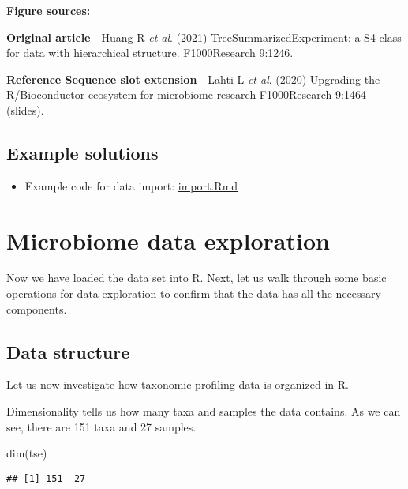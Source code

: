 \documentclass[
]{book}
\newenvironment{Shaded}{\begin{snugshade}}{\end{snugshade}}
\newcommand{\FunctionTok}[1]{\textcolor[rgb]{0.00,0.00,0.00}{#1}}
\newcommand{\NormalTok}[1]{#1}
\providecommand{\tightlist}{%
  \setlength{\itemsep}{0pt}\setlength{\parskip}{0pt}}
\begin{document}
\textbf{Figure sources:}

\textbf{Original article}
- Huang R \emph{et al}. (2021) \href{https://doi.org/10.12688/\%20f1000research.26669.2}{TreeSummarizedExperiment: a S4 class
for data with hierarchical structure}. F1000Research 9:1246.

\textbf{Reference Sequence slot extension}
- Lahti L \emph{et al}. (2020) \href{https://doi.org/10.7490/\%20f1000research.1118447.1}{Upgrading the R/Bioconductor ecosystem for microbiome
research} F1000Research 9:1464 (slides).

\hypertarget{example-solutions}{%
\section{Example solutions}\label{example-solutions}}

\begin{itemize}
\tightlist
\item
  Example code for data import: \url{import.Rmd}
\end{itemize}

\hypertarget{microbiome-data-exploration}{%
\chapter{Microbiome data exploration}\label{microbiome-data-exploration}}

Now we have loaded the data set into R. Next, let us walk through some
basic operations for data exploration to confirm that the data has all
the necessary components.

\hypertarget{data-structure}{%
\section{Data structure}\label{data-structure}}

Let us now investigate how taxonomic profiling data is organized in R.

Dimensionality tells us how many taxa and samples the data
contains. As we can see, there are 151 taxa and 27
samples.

\begin{Shaded}
\begin{Highlighting}[]
\FunctionTok{dim}\NormalTok{(tse)}
\end{Highlighting}
\end{Shaded}

\begin{verbatim}
## [1] 151  27
\end{verbatim}
\end{document}
